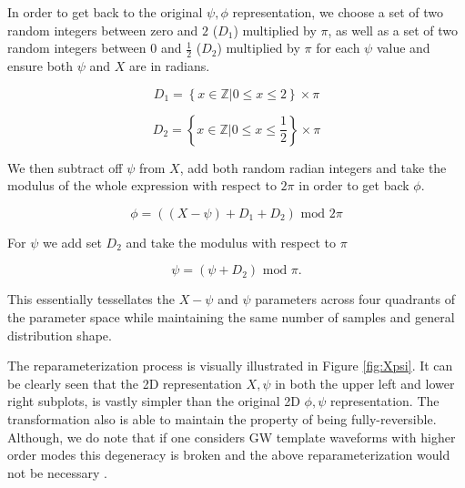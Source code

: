 In order to get back to the original $\psi, \phi$ representation, we choose a set of two random integers between zero 
and $2$ ($D_1$) multiplied by $\pi$, as well as a set of two random integers between $0$ and $\frac{1}{2}$ ($D_2$)
multiplied by $\pi$ for each $\psi$ value and ensure both $\psi$ and $X$ are in radians.

\begin{equation}
    D_{1}=\left\{ x\in\mathbb{Z}|0\leq x\leq 2 \right\} \times \pi
\end{equation}

\begin{equation}
    D_{2}=\left\{ x\in\mathbb{Z}|0\leq x\leq \frac{1}{2} \right\} \times \pi
\end{equation}

We then subtract off $\psi$ from $X$, add both random radian integers and take the modulus 
of the whole expression with respect to $2\pi$ in order to get back $\phi$. 

\begin{equation}
    \phi = ((X - \psi) + D_{1} + D_{2}) \textrm{ mod } 2\pi     
\end{equation}

For $\psi$ we add set $D_2$ and take the modulus with respect to $\pi$

\begin{equation}
    \psi = (\psi + D_2) \textrm{ mod } \pi.
\end{equation}

This essentially tessellates the $X-\psi$ and $\psi$ parameters across 
four quadrants of the parameter space while maintaining the same number of samples and 
 general distribution shape.

The reparameterization process is visually illustrated in Figure \ref{fig:Xpsi}. It can be clearly seen 
that the 2D representation $X, \psi$ in both the upper left and lower right subplots, is vastly 
simpler than the original 2D $\phi, \psi$ representation. The transformation also 
is able to maintain the property of being fully-reversible. Although, we do note that 
if one considers \ac{GW} template waveforms with higher order modes this degeneracy is 
broken and the above reparameterization would not be necessary \cite{10.1093/mnras/stv1584}.

